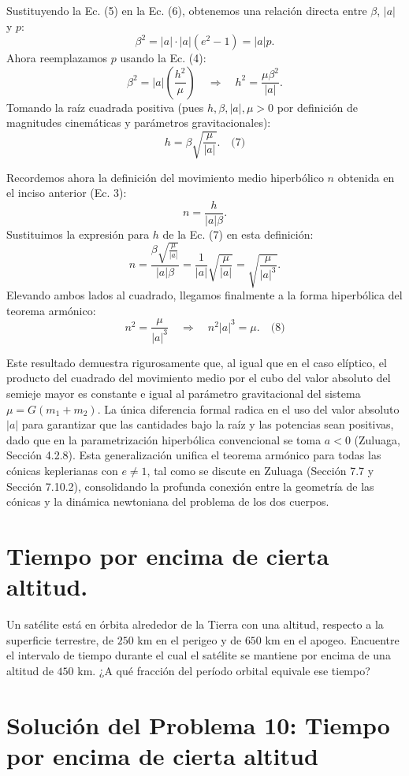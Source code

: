 \documentclass[12pt, a4paper]{article}
\begin{document}
Sustituyendo la Ec. (5) en la Ec. (6), obtenemos una relación directa entre $\beta$, $|a|$ y $p$:
$$
\beta^2 = |a| \cdot |a| (e^2 - 1) = |a| p.
$$
Ahora reemplazamos $p$ usando la Ec. (4):
$$
\beta^2 = |a| \left( \frac{h^2}{\mu} \right) \quad \Longrightarrow \quad h^2 = \frac{\mu \beta^2}{|a|}.
$$
Tomando la raíz cuadrada positiva (pues $h, \beta, |a|, \mu > 0$ por definición de magnitudes cinemáticas y parámetros gravitacionales):
$$
h = \beta \sqrt{\frac{\mu}{|a|}}. \quad \text{(7)}
$$

Recordemos ahora la definición del movimiento medio hiperbólico $n$ obtenida en el inciso anterior (Ec. 3):
$$
n = \frac{h}{|a| \beta}.
$$
Sustituimos la expresión para $h$ de la Ec. (7) en esta definición:
$$
n = \frac{\beta \sqrt{\frac{\mu}{|a|}}}{|a| \beta} = \frac{1}{|a|} \sqrt{\frac{\mu}{|a|}} = \sqrt{\frac{\mu}{|a|^3}}.
$$
Elevando ambos lados al cuadrado, llegamos finalmente a la forma hiperbólica del teorema armónico:
$$
n^2 = \frac{\mu}{|a|^3} \quad \Longrightarrow \quad n^2 |a|^3 = \mu. \quad \text{(8)}
$$

Este resultado demuestra rigurosamente que, al igual que en el caso elíptico, el producto del cuadrado del movimiento medio por el cubo del valor absoluto del semieje mayor es constante e igual al parámetro gravitacional del sistema $\mu = G(m_1 + m_2)$. La única diferencia formal radica en el uso del valor absoluto $|a|$ para garantizar que las cantidades bajo la raíz y las potencias sean positivas, dado que en la parametrización hiperbólica convencional se toma $a < 0$ (Zuluaga, Sección 4.2.8). Esta generalización unifica el teorema armónico para todas las cónicas keplerianas con $e \neq 1$, tal como se discute en Zuluaga (Sección 7.7 y Sección 7.10.2), consolidando la profunda conexión entre la geometría de las cónicas y la dinámica newtoniana del problema de los dos cuerpos.




\section{Tiempo por encima de cierta altitud.} Un satélite está en órbita alrededor de la Tierra con una altitud, respecto a la superficie terrestre, de $250$ km en el perigeo y de $650$ km en el apogeo. Encuentre el intervalo de tiempo durante el cual el satélite se mantiene por encima de una altitud de $450$ km. ¿A qué fracción del período orbital equivale ese tiempo?


\section*{Solución del Problema 10: Tiempo por encima de cierta altitud}
\end{document}

